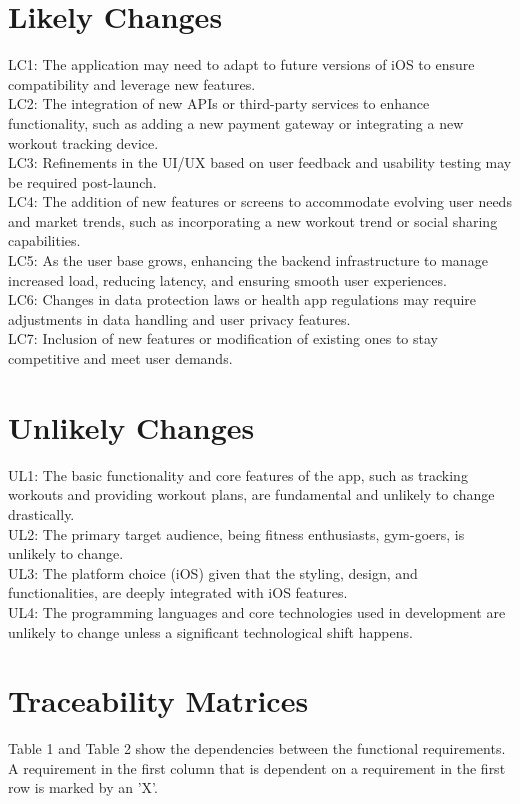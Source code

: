 \documentclass[12pt]{article}
\begin{document}
\section{Likely Changes}

LC1: The application may need to adapt to future versions of iOS to ensure compatibility and leverage new features.\\
LC2: The integration of new APIs or third-party services to enhance functionality, such as adding a new payment gateway or integrating a new workout tracking device.\\
LC3: Refinements in the UI/UX based on user feedback and usability testing may be required post-launch.\\
LC4: The addition of new features or screens to accommodate evolving user needs and market trends, such as incorporating a new workout trend or social sharing capabilities.\\
LC5: As the user base grows, enhancing the backend infrastructure to manage increased load, reducing latency, and ensuring smooth user experiences.\\
LC6: Changes in data protection laws or health app regulations may require adjustments in data handling and user privacy features.\\
LC7: Inclusion of new features or modification of existing ones to stay competitive and meet user demands.

\section{Unlikely Changes}

UL1: The basic functionality and core features of the app, such as tracking workouts and providing workout plans, are fundamental and unlikely to change drastically.\\
UL2: The primary target audience, being fitness enthusiasts, gym-goers, is unlikely to change.\\
UL3: The platform choice (iOS) given that the styling, design, and functionalities, are deeply integrated with iOS features.\\
UL4: The programming languages and core technologies used in development are unlikely to change unless a significant technological shift happens.


\section{Traceability Matrices}
Table 1 and Table 2 show the dependencies between the functional requirements. A requirement in the first column that is dependent on a requirement in the first row is marked by an 'X'.
\end{document}
